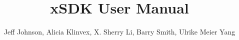 \documentclass[pdf,12pt,report,strict]{SANDreport}
\title{xSDK User Manual}
\author{Jeff Johnson, Alicia Klinvex, X. Sherry Li, Barry Smith, Ulrike Meier
Yang}
\begin{document}
\maketitle





\SANDmain




\end{document}
